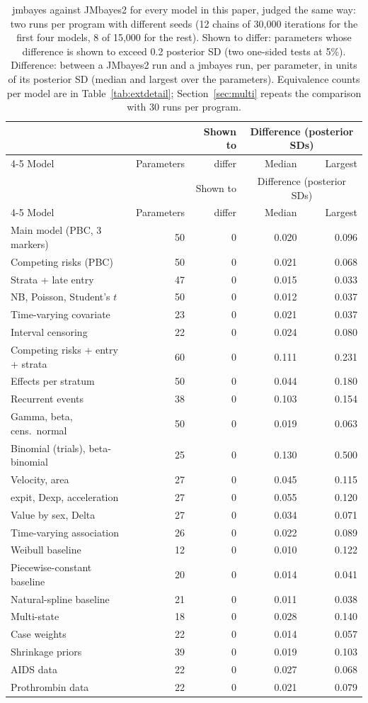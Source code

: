 \begin{longtable}{lrrrr}
\caption{jmbayes against JMbayes2 for every model in this paper, judged the same way: two runs per program with different seeds (12 chains of 30,000 iterations for the first four models, 8 of 15,000 for the rest). Shown to differ: parameters whose difference is shown to exceed 0.2 posterior SD (two one-sided tests at 5\%). Difference: between a JMbayes2 run and a jmbayes run, per parameter, in units of its posterior SD (median and largest over the parameters). Equivalence counts per model are in Table~\ref{tab:extdetail}; Section~\ref{sec:multi} repeats the comparison with 30 runs per program.}\label{tab:ext}\\
\toprule & & Shown to & \multicolumn{2}{c}{Difference (posterior SDs)} \\
\cmidrule(lr){4-5}
Model & Parameters & differ & Median & Largest \\ \midrule \endfirsthead
\toprule & & Shown to & \multicolumn{2}{c}{Difference (posterior SDs)} \\
\cmidrule(lr){4-5}
Model & Parameters & differ & Median & Largest \\ \midrule \endhead
\bottomrule \endlastfoot
Main model (PBC, 3 markers) & 50 & 0 & 0.020 & 0.096 \\
Competing risks (PBC) & 50 & 0 & 0.021 & 0.068 \\
Strata + late entry & 47 & 0 & 0.015 & 0.033 \\
NB, Poisson, Student's $t$ & 50 & 0 & 0.012 & 0.037 \\
Time-varying covariate & 23 & 0 & 0.021 & 0.037 \\
Interval censoring & 22 & 0 & 0.024 & 0.080 \\
Competing risks + entry + strata & 60 & 0 & 0.111 & 0.231 \\
Effects per stratum & 50 & 0 & 0.044 & 0.180 \\
Recurrent events & 38 & 0 & 0.103 & 0.154 \\
Gamma, beta, cens.\ normal & 50 & 0 & 0.019 & 0.063 \\
Binomial (trials), beta-binomial & 25 & 0 & 0.130 & 0.500 \\
Velocity, area & 27 & 0 & 0.045 & 0.115 \\
expit, Dexp, acceleration & 27 & 0 & 0.055 & 0.120 \\
Value by sex, Delta & 27 & 0 & 0.034 & 0.071 \\
Time-varying association & 26 & 0 & 0.022 & 0.089 \\
Weibull baseline & 12 & 0 & 0.010 & 0.122 \\
Piecewise-constant baseline & 20 & 0 & 0.014 & 0.041 \\
Natural-spline baseline & 21 & 0 & 0.011 & 0.038 \\
Multi-state & 18 & 0 & 0.028 & 0.140 \\
Case weights & 22 & 0 & 0.014 & 0.057 \\
Shrinkage priors & 39 & 0 & 0.019 & 0.103 \\
AIDS data & 22 & 0 & 0.027 & 0.068 \\
Prothrombin data & 22 & 0 & 0.021 & 0.079 \\
\end{longtable}
